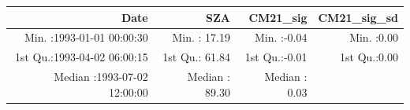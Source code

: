 \documentclass[
  10pt,
  a4paper,oneside]{article}
\begin{document}
\begin{longtable}[]{@{}rrrr@{}}
\toprule
\begin{minipage}[b]{0.34\columnwidth}\raggedleft
Date\strut
\end{minipage} & \begin{minipage}[b]{0.19\columnwidth}\raggedleft
SZA\strut
\end{minipage} & \begin{minipage}[b]{0.18\columnwidth}\raggedleft
CM21\_sig\strut
\end{minipage} & \begin{minipage}[b]{0.18\columnwidth}\raggedleft
CM21\_sig\_sd\strut
\end{minipage}\tabularnewline
\midrule
\endhead
\begin{minipage}[t]{0.34\columnwidth}\raggedleft
Min. :1993-01-01 00:00:30\strut
\end{minipage} & \begin{minipage}[t]{0.19\columnwidth}\raggedleft
Min. : 17.19\strut
\end{minipage} & \begin{minipage}[t]{0.18\columnwidth}\raggedleft
Min. :-0.04\strut
\end{minipage} & \begin{minipage}[t]{0.18\columnwidth}\raggedleft
Min. :0.00\strut
\end{minipage}\tabularnewline
\begin{minipage}[t]{0.34\columnwidth}\raggedleft
1st Qu.:1993-04-02 06:00:15\strut
\end{minipage} & \begin{minipage}[t]{0.19\columnwidth}\raggedleft
1st Qu.: 61.84\strut
\end{minipage} & \begin{minipage}[t]{0.18\columnwidth}\raggedleft
1st Qu.:-0.01\strut
\end{minipage} & \begin{minipage}[t]{0.18\columnwidth}\raggedleft
1st Qu.:0.00\strut
\end{minipage}\tabularnewline
\begin{minipage}[t]{0.34\columnwidth}\raggedleft
Median :1993-07-02 12:00:00\strut
\end{minipage} & \begin{minipage}[t]{0.19\columnwidth}\raggedleft
Median : 89.30\strut
\end{minipage} & \begin{minipage}[t]{0.18\columnwidth}\raggedleft
Median : 0.03\strut
\end{minipage} & \begin{minipage}[t]{0.18\columnwidth}\raggedleft

\end{minipage}
\end{longtable}
\end{document}

